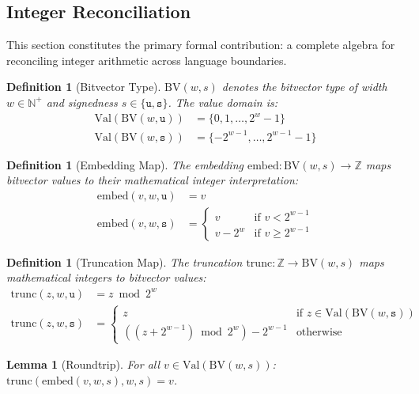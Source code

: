 \documentclass[11pt]{article}
\newtheorem{lemma}[theorem]{Lemma}
\newtheorem{definition}[theorem]{Definition}
\newcommand{\BV}{\mathrm{BV}}
\newcommand{\Val}{\mathrm{Val}}
\newcommand{\trunc}{\mathrm{trunc}}
\newcommand{\embed}{\mathrm{embed}}
\begin{document}
\subsection{Integer Reconciliation}
\label{sec:integer-reconciliation}

This section constitutes the primary formal contribution: a complete algebra for reconciling integer arithmetic across language boundaries.

\begin{definition}[Bitvector Type]
\label{def:bvtype}
$\BV(w, s)$ denotes the bitvector type of width $w \in \mathbb{N}^+$ and signedness $s \in \{\texttt{u}, \texttt{s}\}$. The value domain is:
\begin{align*}
\Val(\BV(w, \texttt{u})) &= \{0, 1, \ldots, 2^w - 1\} \\
\Val(\BV(w, \texttt{s})) &= \{-2^{w-1}, \ldots, 2^{w-1} - 1\}
\end{align*}
\end{definition}

\begin{definition}[Embedding Map]
\label{def:embed}
The embedding $\embed : \BV(w, s) \to \mathbb{Z}$ maps bitvector values to their mathematical integer interpretation:
\begin{align*}
\embed(v, w, \texttt{u}) &= v \\
\embed(v, w, \texttt{s}) &= \begin{cases} v & \text{if } v < 2^{w-1} \\ v - 2^w & \text{if } v \geq 2^{w-1} \end{cases}
\end{align*}
\end{definition}

\begin{definition}[Truncation Map]
\label{def:trunc}
The truncation $\trunc : \mathbb{Z} \to \BV(w, s)$ maps mathematical integers to bitvector values:
\begin{align*}
\trunc(z, w, \texttt{u}) &= z \bmod 2^w \\
\trunc(z, w, \texttt{s}) &= \begin{cases} z & \text{if } z \in \Val(\BV(w, \texttt{s})) \\ ((z + 2^{w-1}) \bmod 2^w) - 2^{w-1} & \text{otherwise} \end{cases}
\end{align*}
\end{definition}

\begin{lemma}[Roundtrip]
\label{lem:roundtrip}
For all $v \in \Val(\BV(w, s))$: $\trunc(\embed(v, w, s), w, s) = v$.
\end{lemma}
\end{document}
